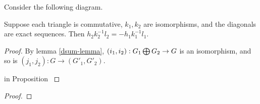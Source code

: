 \begin{lemma}
Consider the following diagram.
Suppose each triangle is commutative, $k_1,k_2$ are isomorphisms, and the diagonals are exact sequences. Then $h_2k_2^{-1}l_2=-h_1k_1^{-1}l_1$.
\end{lemma}

\begin{proof}By lemma \ref{dsum-lemma}, $(i_1,i_2):G_1\bigoplus G_2\rightarrow G$ is an isomorphism, and so is $(j_1,j_2):G\rightarrow(G'_1,G'_2)$.

 in Proposition \cite{direct-sum} 
\cite{Hatcher}
\end{proof}

\begin{theorem}

\end{theorem}

\begin{theorem}
\end{theorem}
\begin{proof}
\end{proof}
